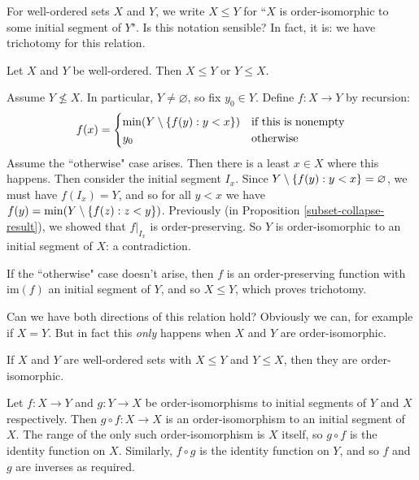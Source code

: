 \documentclass{article}
\begin{document}
For well-ordered sets $X$ and $Y$, we write $X \leq Y$ for ``$X$ is order-isomorphic to some initial segment of $Y$". Is this notation sensible? In fact, it is: we have trichotomy for this relation.

\begin{theorem}
    Let $X$ and $Y$ be well-ordered. Then $X \leq Y$ or $Y \leq X$.
\end{theorem}

\begin{prf}
    Assume $Y \not\leq X$. In particular, $Y \neq \varnothing$, so fix $y_0 \in Y$. Define $f: X \to Y$ by recursion:
    \[
	f(x) = \begin{cases}
		\min(Y \setminus\left\lbrace f(y) : y < x \right\rbrace) & \text{if this is nonempty} \\
		y_0 & \!\mathrel{\, \text{otherwise}}
	\end{cases}
	\]
	Assume the ``otherwise" case arises. Then there is a least $x \in X$ where this happens. Then consider the initial segment $I_x$. Since $Y \setminus\left\lbrace f(y) : y < x \right\rbrace = \varnothing$, we must have $f(I_x) = Y$, and so for all $y < x$ we have $f(y) = \min (Y \setminus \left\lbrace f(z) : z < y \right\rbrace)$. Previously (in Proposition \ref{subset-collapse-result}), we showed that $f|_{I_x}$ is order-preserving. So $Y$ is order-isomorphic to an initial segment of $X$: a contradiction.
	
	If the ``otherwise" case doesn't arise, then $f$ is an order-preserving function with $\mathrm{im}(f)$ an initial segment of $Y$, and so $X \leq Y$, which proves trichotomy.
\end{prf}

Can we have both directions of this relation hold? Obviously we can, for example if $X = Y$. But in fact this \textit{only} happens when $X$ and $Y$ are order-isomorphic.

\begin{proposition}
    If $X$ and $Y$ are well-ordered sets with $X \leq Y$ and $Y \leq X$, then they are order-isomorphic.
\end{proposition}

\begin{prf}
    Let $f: X \to Y$ and $g: Y \to X$ be order-isomorphisms to initial segments of $Y$ and $X$ respectively. Then $g \circ f: X \to X$ is an order-isomorphism to an initial segment of $X$. The range of the  only such order-isomorphism is $X$ itself, so $g \circ f$ is the identity function on $X$. Similarly, $f \circ g$ is the identity function on $Y$, and so $f$ and $g$ are inverses as required.
\end{prf}
\end{document}
